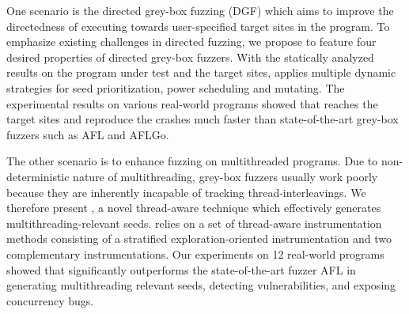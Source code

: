 One scenario is the directed grey-box fuzzing (DGF) which aims to improve the directedness of executing towards user-specified target sites in the program. To emphasize existing challenges in \mbox{directed} fuzzing, we propose \dFOT to feature four desired properties of directed grey-box fuzzers. With the statically analyzed results on the program under test and the target sites, \dFOT applies multiple dynamic strategies for seed prioritization, power scheduling and \mbox{mutating}.
The experimental results on various real-world \mbox{programs} showed that \dFOT reaches the target sites and reproduce the crashes much faster than state-of-the-art grey-box fuzzers such as AFL and AFLGo.

The other scenario is to enhance fuzzing on multithreaded programs. Due to non-deterministic nature of multithreading, grey-box fuzzers usually work poorly because they are inherently incapable of tracking thread-interleavings.
We therefore present \mtfuzz, a novel thread-aware technique which effectively generates multithreading-relevant seeds. \mtfuzz relies on a set of thread-aware instrumentation methods consisting of a stratified exploration-oriented instrumentation and two complementary instrumentations. Our experiments on 12 real-world programs showed that \mtfuzz significantly outperforms the state-of-the-art fuzzer AFL in generating multithreading relevant seeds, detecting vulnerabilities, and exposing concurrency bugs.

